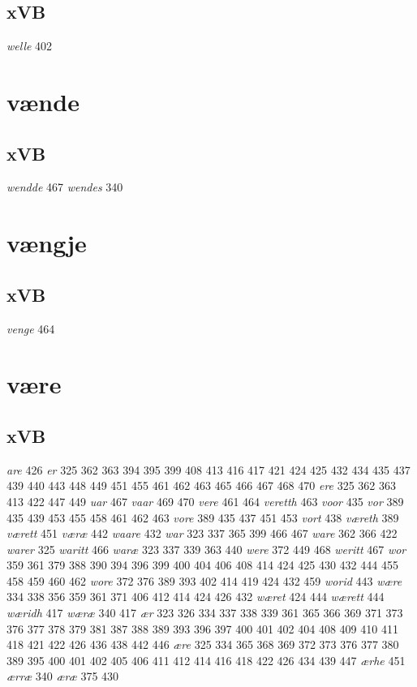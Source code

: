 \documentclass[a4paper,twocolumn]{article}
\begin{document}
\subsection{xVB}
\label{sec:org9c6786c}
\emph{welle} 402 
\section{vænde}
\label{sec:org9c0cc32}
\subsection{xVB}
\label{sec:orga2ca50c}
\emph{wendde} 467 \emph{wendes} 340 
\section{vængje}
\label{sec:org22d2bed}
\subsection{xVB}
\label{sec:orgfd5a1ce}
\emph{venge} 464 
\section{være}
\label{sec:org9650f45}
\subsection{xVB}
\label{sec:org479b354}
\emph{are} 426 \emph{er} 325 362 363 394 395 399 408 413 416 417 421 424 425 432 434 435 437 439 440 443 448 449 451 455 461 462 463 465 466 467 468 470 \emph{ere} 325 362 363 413 422 447 449 \emph{uar} 467 \emph{vaar} 469 470 \emph{vere} 461 464 \emph{veretth} 463 \emph{voor} 435 \emph{vor} 389 435 439 453 455 458 461 462 463 \emph{vore} 389 435 437 451 453 \emph{vort} 438 \emph{væreth} 389 \emph{værett} 451 \emph{væræ} 442 \emph{waare} 432 \emph{war} 323 337 365 399 466 467 \emph{ware} 362 366 422 \emph{warer} 325 \emph{waritt} 466 \emph{waræ} 323 337 339 363 440 \emph{were} 372 449 468 \emph{weritt} 467 \emph{wor} 359 361 379 388 390 394 396 399 400 404 406 408 414 424 425 430 432 444 455 458 459 460 462 \emph{wore} 372 376 389 393 402 414 419 424 432 459 \emph{worid} 443 \emph{wære} 334 338 356 359 361 371 406 412 414 424 426 432 \emph{wæret} 424 444 \emph{wærett} 444 \emph{wæridh} 417 \emph{wæræ} 340 417 \emph{ær} 323 326 334 337 338 339 361 365 366 369 371 373 376 377 378 379 381 387 388 389 393 396 397 400 401 402 404 408 409 410 411 418 421 422 426 436 438 442 446 \emph{ære} 325 334 365 368 369 372 373 376 377 380 389 395 400 401 402 405 406 411 412 414 416 418 422 426 434 439 447 \emph{ærhe} 451 \emph{ærræ} 340 \emph{æræ} 375 430 
\end{document}
